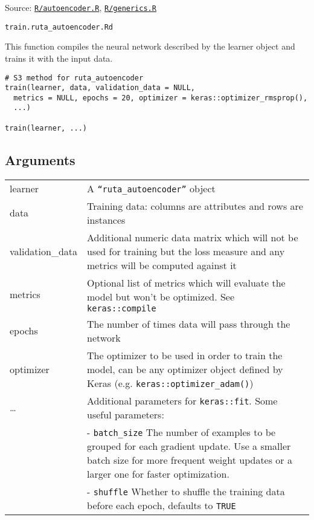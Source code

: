 Source:
\href{https://github.com/fdavidcl/ruta/blob/master/R/autoencoder.R}{\texttt{R/autoencoder.R}},
\href{https://github.com/fdavidcl/ruta/blob/master/R/generics.R}{\texttt{R/generics.R}}

\texttt{train.ruta\_autoencoder.Rd}

This function compiles the neural network described by the learner
object and trains it with the input data.

\begin{verbatim}
# S3 method for ruta_autoencoder
train(learner, data, validation_data = NULL,
  metrics = NULL, epochs = 20, optimizer = keras::optimizer_rmsprop(),
  ...)

train(learner, ...)
\end{verbatim}

\hypertarget{arguments}{\subsection{\texorpdfstring{\protect\hyperlink{arguments}{}Arguments}{Arguments}}\label{arguments}}

\begin{longtable}[c]{@{}>{\small}p{3cm}>{\raggedright}p{12.5cm}@{}}
\toprule

learner
 &

A \texttt{``ruta\_autoencoder''} object
\tabularnewline

data
 &

Training data: columns are attributes and rows are instances
\tabularnewline

validation\_data
 &

Additional numeric data matrix which will not be used for training but
the loss measure and any metrics will be computed against it
\tabularnewline

metrics
 &

Optional list of metrics which will evaluate the model but won't be
optimized. See \texttt{keras::compile}
\tabularnewline

epochs
 &

The number of times data will pass through the network
\tabularnewline

optimizer
 &

The optimizer to be used in order to train the model, can be any
optimizer object defined by Keras (e.g.
\texttt{keras::optimizer\_adam()})
\tabularnewline

\ldots{}
 &

Additional parameters for \texttt{keras::fit}. Some useful parameters:
\tabularnewline

 &

- \texttt{batch\_size} The number of examples to be grouped for each
gradient update. Use a smaller batch size for more frequent weight
updates or a larger one for faster optimization.
\tabularnewline

 &

- \texttt{shuffle} Whether to shuffle the training data before each
epoch, defaults to \texttt{TRUE}
\tabularnewline
\bottomrule
\end{longtable}

